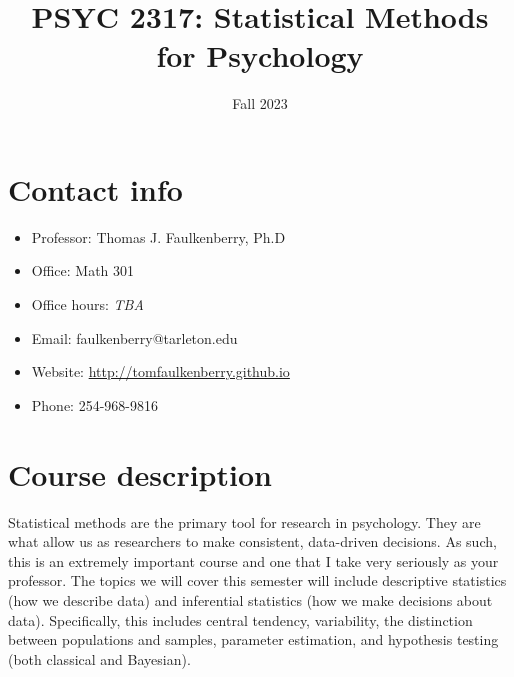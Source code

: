 \documentclass[10pt]{article}
\date{Fall 2023}
\title{PSYC 2317: Statistical Methods for Psychology}
\begin{document}
\maketitle

\section*{Contact info}
\label{sec:org008f57c}
\begin{itemize}
\item Professor: Thomas J. Faulkenberry, Ph.D
\item Office: Math 301
\item Office hours: \emph{TBA}
\item Email: faulkenberry@tarleton.edu
\item Website: \url{http://tomfaulkenberry.github.io}
\item Phone: 254-968-9816
\end{itemize}

\section*{Course description}
\label{sec:org7af40b5}

Statistical methods are the primary tool for research in psychology. They are what allow us as researchers to make consistent, data-driven decisions.  As such, this is an extremely important course and one that I take very seriously as your professor. The topics we will cover this semester will include descriptive statistics (how we describe data) and inferential statistics (how we make decisions about data).  Specifically, this includes central tendency, variability, the distinction between populations and samples, parameter estimation, and hypothesis testing (both classical and Bayesian).
\end{document}
